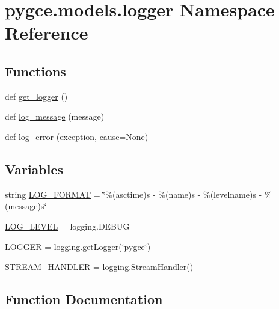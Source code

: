 \hypertarget{namespacepygce_1_1models_1_1logger}{}\section{pygce.\+models.\+logger Namespace Reference}
\label{namespacepygce_1_1models_1_1logger}
\subsection*{Functions}
\begin{DoxyCompactItemize}
\item 
def \hyperlink{namespacepygce_1_1models_1_1logger_a21dc64f056ed30d373234de8425a2f18}{get\+\_\+logger} ()
\item 
def \hyperlink{namespacepygce_1_1models_1_1logger_a28a7a7a6cd33a45d28e7f3ea2cdd3fc8}{log\+\_\+message} (message)
\item 
def \hyperlink{namespacepygce_1_1models_1_1logger_ad235bade65af8d370a613aa941dc6958}{log\+\_\+error} (exception, cause=None)
\end{DoxyCompactItemize}
\subsection*{Variables}
\begin{DoxyCompactItemize}
\item 
string \hyperlink{namespacepygce_1_1models_1_1logger_aee1f7347b8ae24b2bea52b96172cf468}{L\+O\+G\+\_\+\+F\+O\+R\+M\+AT} = \char`\"{}\%(asctime)s -\/ \%(name)s -\/ \%(levelname)s -\/ \%(message)s\char`\"{}
\item 
\hyperlink{namespacepygce_1_1models_1_1logger_a50a88a5abe8fe8e177537163d60acf90}{L\+O\+G\+\_\+\+L\+E\+V\+EL} = logging.\+D\+E\+B\+UG
\item 
\hyperlink{namespacepygce_1_1models_1_1logger_a759e16ec25aef297ae4fd2a39922ceb4}{L\+O\+G\+G\+ER} = logging.\+get\+Logger(\char`\"{}pygce\char`\"{})
\item 
\hyperlink{namespacepygce_1_1models_1_1logger_ab6225d6a55e9813da66713928eb58df8}{S\+T\+R\+E\+A\+M\+\_\+\+H\+A\+N\+D\+L\+ER} = logging.\+Stream\+Handler()
\end{DoxyCompactItemize}


\subsection{Function Documentation}
\mbox{\label{namespacepygce_1_1models_1_1logger_a21dc64f056ed30d373234de8425a2f18}} 
